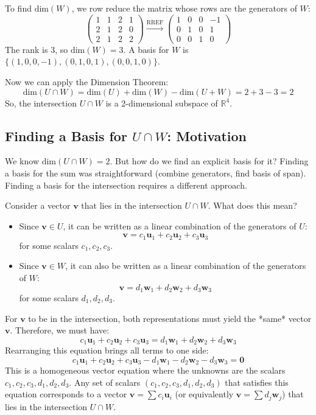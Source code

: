 \documentclass[11pt]{article}
\theoremstyle{definition}
\theoremstyle{remark}
\newcommand{\R}{\mathbb{R}}
\newcommand{\vsdim}{\text{dim}}
\newcommand{\vecu}{\mathbf{u}}
\newcommand{\vecv}{\mathbf{v}}
\newcommand{\vecw}{\mathbf{w}}
\newcommand{\veczero}{\mathbf{0}}
\begin{document}
To find $\vsdim(W)$, we row reduce the matrix whose rows are the generators of $W$:
\[ \begin{pmatrix} 1 & 1 & 2 & 1 \\ 2 & 1 & 2 & 0 \\ 2 & 1 & 2 & 2 \end{pmatrix} \xrightarrow{\text{RREF}} \begin{pmatrix} 1 & 0 & 0 & -1 \\ 0 & 1 & 0 & 1 \\ 0 & 0 & 1 & 0 \end{pmatrix} \]
The rank is 3, so $\vsdim(W) = 3$. A basis for $W$ is $\{(1, 0, 0, -1), (0, 1, 0, 1), (0, 0, 1, 0)\}$.

Now we can apply the Dimension Theorem:
\[ \vsdim(U \cap W) = \vsdim(U) + \vsdim(W) - \vsdim(U+W) = 2 + 3 - 3 = 2 \]
So, the intersection $U \cap W$ is a 2-dimensional subspace of $\R^4$.

\subsection{Finding a Basis for $U \cap W$: Motivation}

We know $\vsdim(U \cap W) = 2$. But how do we find an explicit basis for it? Finding a basis for the sum was straightforward (combine generators, find basis of span). Finding a basis for the intersection requires a different approach.

Consider a vector $\vecv$ that lies in the intersection $U \cap W$. What does this mean?
\begin{itemize}
    \item Since $\vecv \in U$, it can be written as a linear combination of the generators of $U$:
      \[ \vecv = c_1 \vecu_1 + c_2 \vecu_2 + c_3 \vecu_3 \]
      for some scalars $c_1, c_2, c_3$.
    \item Since $\vecv \in W$, it can also be written as a linear combination of the generators of $W$:
      \[ \vecv = d_1 \vecw_1 + d_2 \vecw_2 + d_3 \vecw_3 \]
      for some scalars $d_1, d_2, d_3$.
\end{itemize}
For $\vecv$ to be in the intersection, both representations must yield the *same* vector $\vecv$. Therefore, we must have:
\[ c_1 \vecu_1 + c_2 \vecu_2 + c_3 \vecu_3 = d_1 \vecw_1 + d_2 \vecw_2 + d_3 \vecw_3 \]
Rearranging this equation brings all terms to one side:
\[ c_1 \vecu_1 + c_2 \vecu_2 + c_3 \vecu_3 - d_1 \vecw_1 - d_2 \vecw_2 - d_3 \vecw_3 = \veczero \]
This is a homogeneous vector equation where the unknowns are the scalars $c_1, c_2, c_3, d_1, d_2, d_3$. Any set of scalars $(c_1, c_2, c_3, d_1, d_2, d_3)$ that satisfies this equation corresponds to a vector $\vecv = \sum c_i \vecu_i$ (or equivalently $\vecv = \sum d_j \vecw_j$) that lies in the intersection $U \cap W$.
\end{document}
